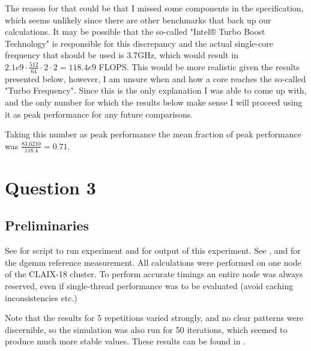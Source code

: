 \documentclass{scrartcl}
\begin{document}
	The reason for that could be that I missed some components in the specification, which seems unlikely since there are other benchmarks that back up our calculations.
	It may be possible that the so-called "Intel® Turbo Boost Technology" is responsible for this discrepancy and the actual single-core frequency that should be used is $3.7$GHz, which would result in $2.1e9 \cdot \frac{512}{64} \cdot 2 \cdot 2 = 118.4e9$ FLOPS.
	This would be more realistic given the results presented below, however, I am unsure when and how a core reaches the so-called "Turbo Frequency".
	Since this is the only explanation I was able to come up with, and the only number for which the results below make sense I will proceed using it as peak performance for any future comparisons.
	
	Taking this number as peak performance the mean fraction of peak performance was $\frac{83.6210}{118.4}=0.71$.
	
	\section{Question 3}
	\subsection{Preliminaries}
	See  for script to run experiment and  for output of this experiment.
	See ,  and  for the dgemm reference measurement.
	All calculations were performed on one node of the CLAIX-18 cluster.
	To perform accurate timings an entire node was always reserved, even if single-thread performance was to be evaluated (avoid caching inconsistencies etc.)
	
	Note that the results for 5 repetitions varied strongly, and no clear patterns were discernible, so the simulation was also run for 50 iterations, which seemed to produce much more stable values.
	These results can be found in .
	
\end{document}
